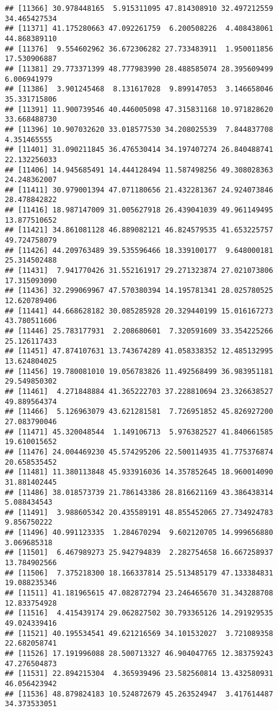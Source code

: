 \documentclass[
]{article}
\begin{document}
\begin{verbatim}
## [11366] 30.978448165  5.915311095 47.814308910 32.497212559 34.465427534
## [11371] 41.175280663 47.092261759  6.200508226  4.408438061 44.868389110
## [11376]  9.554602962 36.672306282 27.733483911  1.950011856 17.530906887
## [11381] 29.773371399 48.777983990 28.488585074 28.395609499  6.006941979
## [11386]  3.901245468  8.131617028  9.899147053  3.146658046 35.331715806
## [11391] 11.900739546 40.446005098 47.315831168 10.971828620 33.668488730
## [11396] 10.907032620 33.018577530 34.208025539  7.844837708  4.351465555
## [11401] 31.090211845 36.476530414 34.197407274 26.840488741 22.132256033
## [11406] 14.945685491 14.444128494 11.587498256 49.308028363 24.248362007
## [11411] 30.979001394 47.071180656 21.432281367 24.924073846 28.478842822
## [11416] 18.987147009 31.005627918 26.439041039 49.961149495 13.877510652
## [11421] 34.861081128 46.889082121 46.824579535 41.653225757 49.724758079
## [11426] 44.209763489 39.535596466 18.339100177  9.648000181 25.314502488
## [11431]  7.941770426 31.552161917 29.271323874 27.021073806 17.315093090
## [11436] 32.299069967 47.570380394 14.195781341 28.025780525 12.620789406
## [11441] 44.668628182 30.085285928 20.329440199 15.016167273 43.780511606
## [11446] 25.783177931  2.208680601  7.320591609 33.354225266 25.126117433
## [11451] 47.874107631 13.743674289 41.058338352 12.485132995 13.624804025
## [11456] 19.780081010 19.056783826 11.492568499 36.983951181 29.549850302
## [11461]  4.271848884 41.365222703 37.228810694 23.326638527 49.889564374
## [11466]  5.126963079 43.621281581  7.726951852 45.826927200 27.083790046
## [11471] 45.320048544  1.149106713  5.976382527 41.840661585 19.610015652
## [11476] 24.004469230 45.574295206 22.500114935 41.775376874 20.658535452
## [11481] 11.380113848 45.933916036 14.357852645 18.960014090 31.881402445
## [11486] 38.018573739 21.786143386 28.816621169 43.386438314  5.088434543
## [11491]  3.988605342 20.435589191 48.855452065 27.734924783  9.856750222
## [11496] 40.991123335  1.284670294  9.602120705 14.999656880  3.069685318
## [11501]  6.467989273 25.942794839  2.282754658 16.667258937 13.784902566
## [11506]  7.375218300 18.166337814 25.513485179 47.133384831 19.088235346
## [11511] 41.181965615 47.082872794 23.246465670 31.343288708 12.833754928
## [11516]  4.415439174 29.062827502 30.793365126 14.291929535 49.024339416
## [11521] 40.195534541 49.621216569 34.101532027  3.721089358 22.682058741
## [11526] 17.191996088 28.500713327 46.904047765 12.383759243 47.276504873
## [11531] 22.894215304  4.365939496 23.582560814 13.432580931 46.056423942
## [11536] 48.879824183 10.524872679 45.263524947  3.417614487 34.373533051

\end{verbatim}
\end{document}
